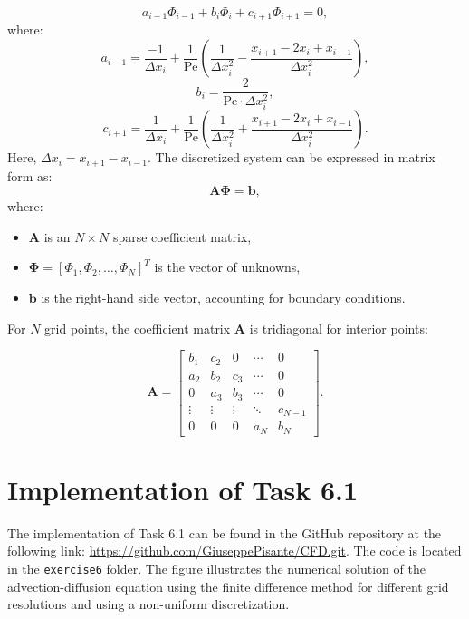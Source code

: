 \documentclass{article}
\begin{document}
\[
a_{i-1} \Phi_{i-1} + b_i \Phi_i + c_{i+1} \Phi_{i+1} = 0,
\]
where:
\[
a_{i-1} = \frac{-1}{\Delta x_i} + \frac{1}{\text{Pe}} \left( \frac{1}{\Delta x_i^2} - \frac{x_{i+1} - 2x_i + x_{i-1}}{\Delta x_i^2} \right),
\]
\[
b_i = \frac{2}{\text{Pe} \cdot \Delta x_i^2},
\]
\[
c_{i+1} = \frac{1}{\Delta x_i} + \frac{1}{\text{Pe}} \left( \frac{1}{\Delta x_i^2} + \frac{x_{i+1} - 2x_i + x_{i-1}}{\Delta x_i^2} \right).
\]
Here, \(\Delta x_i = x_{i+1} - x_{i-1}\).
The discretized system can be expressed in matrix form as:
\[
\mathbf{A} \boldsymbol{\Phi} = \mathbf{b},
\]
where:
\begin{itemize}
    \item \(\mathbf{A}\) is an \(N \times N\) sparse coefficient matrix,
    \item \(\boldsymbol{\Phi} = [\Phi_1, \Phi_2, \dots, \Phi_N]^T\) is the vector of unknowns,
    \item \(\mathbf{b}\) is the right-hand side vector, accounting for boundary conditions.
\end{itemize}
For \(N\) grid points, the coefficient matrix \(\mathbf{A}\) is tridiagonal for interior points:

\[
\mathbf{A} =
\begin{bmatrix}
b_1 & c_2 & 0 & \cdots & 0 \\
a_2 & b_2 & c_3 & \cdots & 0 \\
0 & a_3 & b_3 & \cdots & 0 \\
\vdots & \vdots & \vdots & \ddots & c_{N-1} \\
0 & 0 & 0 & a_{N} & b_{N}
\end{bmatrix}.
\]

\section{Implementation of Task 6.1}
The implementation of Task 6.1 can be found in the GitHub repository at the following link: \url{https://github.com/GiuseppePisante/CFD.git}. 
The code is located in the \texttt{exercise6} folder. The figure illustrates the numerical solution of the advection-diffusion equation 
using the finite difference method for different grid resolutions and using a non-uniform discretization. 
\end{document}
